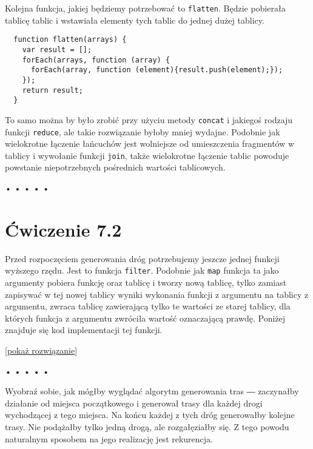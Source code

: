   
Kolejna funkcja, jakiej będziemy potrzebować to \texttt{flatten}. Będzie pobierała tablicę tablic i wstawiała elementy tych tablic do jednej dużej tablicy.

  
\begin{verbatim} 
  function flatten(arrays) {
    var result = [];
    forEach(arrays, function (array) {
      forEach(array, function (element){result.push(element);});
    });
    return result;
  }
 \end{verbatim}
  
To samo można by było zrobić przy użyciu metody \texttt{concat} i jakiegoś rodzaju funkcji \texttt{reduce}, ale takie rozwiązanie byłoby mniej wydajne. Podobnie jak wielokrotne łączenie łańcuchów jest wolniejsze od umieszczenia fragmentów w tablicy i wywołanie funkcji \texttt{join}, także wielokrotne łączenie tablic powoduje powstanie niepotrzebnych pośrednich wartości tablicowych.



\begin{center}
• • • • •
\end{center}

  
\section*{Ćwiczenie 7.2}
\label{sec:7.2}
  
    
Przed rozpoczęciem generowania dróg potrzebujemy jeszcze jednej funkcji wyższego rzędu. Jest to funkcja \texttt{filter}. Podobnie jak \texttt{map} funkcja ta jako argumenty pobiera funkcję oraz tablicę i tworzy nową tablicę, tylko zamiast zapisywać w tej nowej tablicy wyniki wykonania funkcji z argumentu na tablicy z argumentu, zwraca tablicę zawierającą tylko te wartości ze starej tablicy, dla których funkcja z argumentu zwróciła wartość oznaczającą prawdę. Poniżej znajduje się kod implementacji tej funkcji.

  
[\hyperref[sol:7.2]{pokaż rozwiązanie}]
  


\begin{center}
• • • • •
\end{center}

  
Wyobraź sobie, jak mógłby wyglądać algorytm generowania tras ― zaczynałby działanie od miejsca początkowego i generował trasy dla każdej drogi wychodzącej z tego miejsca. Na końcu każdej z tych dróg generowałby kolejne trasy. Nie podążałby tylko jedną drogą, ale rozgałęziałby się. Z tego powodu naturalnym sposobem na jego realizację jest rekurencja.

